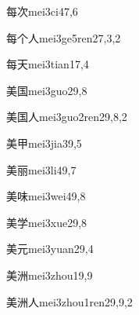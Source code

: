 \begin{verbete}{每次}{mei3ci4}{7,6}
\end{verbete}

\begin{verbete}{每个人}{mei3ge5ren2}{7,3,2}
\end{verbete}

\begin{verbete}{每天}{mei3tian1}{7,4}
\end{verbete}

\begin{verbete}{美国}{mei3guo2}{9,8}
\end{verbete}

\begin{verbete}{美国人}{mei3guo2ren2}{9,8,2}
\end{verbete}

\begin{verbete}{美甲}{mei3jia3}{9,5}
\end{verbete}

\begin{verbete}{美丽}{mei3li4}{9,7}
\end{verbete}

\begin{verbete}{美味}{mei3wei4}{9,8}
\end{verbete}

\begin{verbete}{美学}{mei3xue2}{9,8}
\end{verbete}

\begin{verbete}{美元}{mei3yuan2}{9,4}
\end{verbete}

\begin{verbete}{美洲}{mei3zhou1}{9,9}
\end{verbete}

\begin{verbete}{美洲人}{mei3zhou1ren2}{9,9,2}
\end{verbete}


